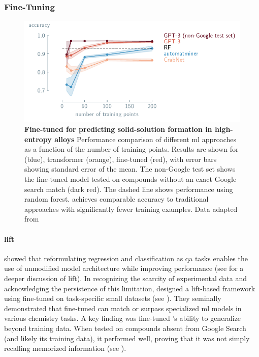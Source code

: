 \subsubsection{Fine-Tuning}\label{sec:prediction_FT}
\begin{figure}[htb] 
    \centering
    \includegraphics[width=1\textwidth]{figures/property_gptchem.pdf}
    \caption{\textbf{Fine-tuned  for predicting solid-solution formation in high-entropy alloys} Performance comparison of different \gls{ml} approaches as a function of the number of training points. Results are shown for  (blue),  transformer (orange),  fine-tuned  (red), with error bars showing standard error of the mean. The non-Google test set shows the fine-tuned  model tested on compounds without an exact Google search match (dark red). The dashed line shows performance using random forest.  achieves comparable accuracy to traditional approaches with significantly fewer training examples. Data adapted from \textcite{jablonka2024leveraging}}
    \label{fig:gptchem}
\end{figure}

\paragraph{\gls{lift}} \textcite{dinh2022lift} showed that reformulating regression and classification as \gls{qa} tasks enables the use of unmodified model architecture while improving performance (see  for a deeper discussion of \gls{lift}). 
In recognizing the scarcity of experimental data and acknowledging the persistence of this limitation, \textcite{jablonka2024leveraging} designed a \gls{lift}-based framework using  fine-tuned on task-specific small datasets (see ). 
They seminally demonstrated that fine-tuned  can match or surpass specialized \gls{ml} models in various chemistry tasks. A key finding was fine-tuned 's ability to generalize beyond training data. 
When tested on compounds absent from Google Search (and likely its training data), it performed well, proving that it was not simply recalling memorized information (see ).

